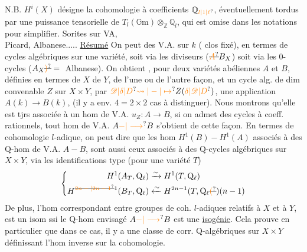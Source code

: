 N.B. $H^i(X)$ désigne la cohomologie à coefficients $\mathbb{Q}_{\unsure{l|1|\ell}}$, éventuellement tordus par une puissance tensorielle de $T_l(\mathbb{G}\mathrm{m})\otimes_{\mathbb{Z}}\mathbb{Q}_l$, qui est omise dans les notations pour simplifier.
Sorites sur VA,\\
Picard, Albanese..... 
\uline{Résumé} On peut  des V.A. sur $k$ ( clos fixé),  en termes de cycles algébriques  sur une variété, soit via les diviseurs ($\deleted{\unsure{A}}B_X$) soit via les $0$-cycles ($A_X\deleted{\unsure{)}}={}$ Albanese). On obtient , pour deux variétés abéliennes $A$ et $B$, définies  en termes de $X$  de $Y$, de l'une ou de l'autre façon, et un cycle alg. de dim convenable $Z$ sur $X\times Y$, par $\unsure{\mathscr{D}|\delta|D}\unsure{\leadsto|-|\mapsto} Z(\unsure{\delta|\mathscr{D}|D})$, une application $A(k)\longrightarrow B(k)$,  (il y a env. $4=2\times2$ cas à distinguer). Nous montrons qu'elle est tjrs associée à un hom de V.A. $u_Z:A\longrightarrow B$,   si on admet des cycles à coeff. rationnels,  tout hom de V.A. $A\unsure{-|\longrightarrow} B$ s'obtient de cette façon. En termes de cohomologie $l$-adique, on peut dire que les hom $H^1(B)-H^1(A)$ associés à des $\mathrm{Q}$-hom de V.A. $A-B$, sont aussi ceux associés à des $\mathrm{Q}$-cycles
algébriques sur $X\times Y$, via les identifications  type (pour une variété $T$)
\[
\left\{\begin{aligned}
H^1(A_T,\mathrm{Q}_{\ell})&\xrightarrow{\sim}H^1(T,\mathrm{Q}_{\ell})\\
H^{\deleted{\unsure{2n-|2n-1}}1}(B_T,\mathrm{Q}_{\ell})&\xleftarrow{\sim}H^{2n-1}(T,\mathrm{Q}_{\ell}\deleted{\unsure{(}})(n-1)
\end{aligned}\right.
\]
De plus, l'hom correspondant entre groupes de coh. $l$-adiques relatifs à $X$ et à $Y$, est un isom ssi le $\mathrm{Q}$-hom  envisagé $A\unsure{-|\longrightarrow}B$ est une \uline{isogénie}. Cela prouve en particulier que dans ce cas, il y a une classe de corr. $\mathrm{Q}$-algébriques sur $X\times Y$ définissant l'hom inverse sur la cohomologie.

